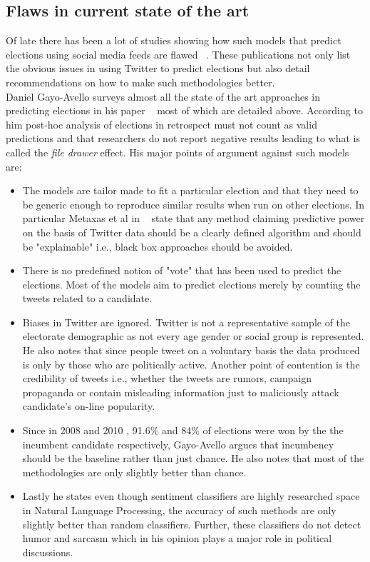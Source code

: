 \subsection{Flaws in current state of the art}
Of late there has been a lot of studies showing how such models that predict elections using social media feeds are flawed ~\cite{metaxas2011not,gayo2012wanted,gayo2011don,gayo2011limits}.
These publications not only list the obvious issues in using Twitter to predict elections but also detail recommendations on how to make such methodologies better.\\
Daniel Gayo-Avello surveys almost all the state of the art approaches in predicting elections in his paper ~\cite{gayo2012wanted} most of which are detailed above.
According to him post-hoc analysis of elections in retrospect must not count as valid predictions and that researchers do not report negative results leading to what is called the \emph{file drawer} effect. 
His major points of argument against such models are:
\begin{itemize}
\item
The models are tailor made to fit a particular election and that they need to be generic enough to reproduce similar results when run on other elections.
In particular Metaxas et al in ~\cite{metaxas2011not} state that any method claiming predictive power on the basis of Twitter data should be a clearly defined algorithm and should be "explainable" i.e., black box approaches should be avoided.
\item
There is no predefined notion of "vote" that has been used to predict the elections.
Most of the models aim to predict elections merely by counting the tweets related to a candidate.
\item
Biases in Twitter are ignored. Twitter is not a representative sample of the electorate demographic as not every age gender or social group is represented.
He also notes that since people tweet on a voluntary basis the data produced is only by those who are politically active. 
Another point of contention is the credibility of tweets i.e., whether the tweets are rumors, campaign propaganda or contain misleading information just to maliciously attack candidate's on-line popularity.
\item
Since in 2008 and 2010 , 91.6\% and 84\% of elections were won by the the incumbent candidate respectively, Gayo-Avello argues that incumbency should be the baseline rather than just chance.
He also notes that most of the methodologies are only slightly better than chance.
\item
Lastly he states even though sentiment classifiers are highly researched space in Natural Language Processing, the accuracy of such methods are only slightly better than random classifiers. 
Further, these classifiers do not detect humor and sarcasm which in his opinion plays a major role in political discussions.
\end{itemize}
